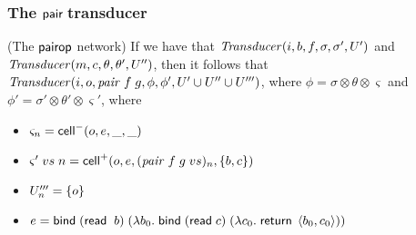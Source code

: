 \subsubsection{The $\mathsf{pair}\;$transducer}

\begin{lemma}{(The $\mathsf{pairop}$ network)}
If we have that $\mathit{Transducer}(i, b, f, \sigma, \sigma', U')$ and $\mathit{Transducer}(m, c, \theta, \theta', U'')$, 
then it follows that $\mathit{Transducer}(i, o, \mathit{pair}\;f\;g, \phi, \phi', U' \cup U'' \cup U''')$, where $\phi = \sigma \otimes \theta \otimes \varsigma$
and $\phi' = \sigma' \otimes \theta' \otimes \varsigma'$, where
\begin{itemize}
\item $\varsigma_n = \mathsf{cell}^{-}({o}, {e}, {\_}, {\_})$ 
\item $\varsigma'\;vs\;n = \mathsf{cell}^{+}({o}, {e}, {(\mathit{pair}\;f\;g\;vs)_n}, {\{{b,c}\}})$
\item $U'''_n = \{{o}\}$
\item $e = \mathsf{bind}\; (\mathsf{read}\;\;b)\; (\lambda b_0.\;\mathsf{bind}\; (\mathsf{read}\; c)\;(\lambda c_0.\;\mathsf{return}\;\left<{b_0},{c_0}\right>))$
\end{itemize}
\end{lemma}
